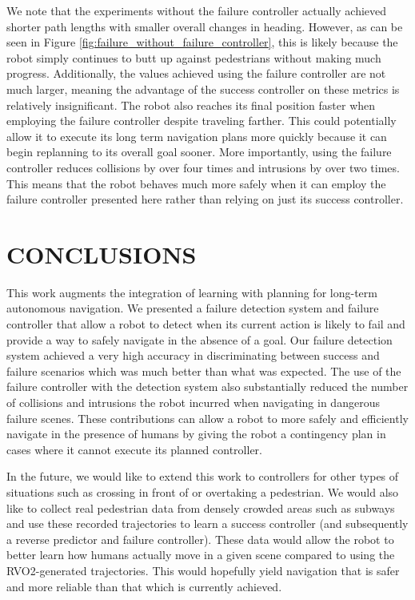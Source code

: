 \documentclass[letterpaper, 10 pt, conference]{ieeeconf}  %
\begin{document}
	We note that the experiments without the failure controller actually achieved shorter path lengths with smaller overall changes in heading. However, as can be seen in Figure \ref{fig:failure_without_failure_controller}, this is likely because the robot simply continues to butt up against pedestrians without making much progress. Additionally, the values achieved using the failure controller are not much larger, meaning the advantage of the success controller on these metrics is relatively insignificant. The robot also reaches its final position faster when employing the failure controller despite traveling farther. This could potentially allow it to execute its long term navigation plans more quickly because it can begin replanning to its overall goal sooner. More importantly, using the failure controller reduces collisions by over four times and intrusions by over two times. This means that the robot behaves much more safely when it can employ the failure controller presented here rather than relying on just its success controller. 

\section{CONCLUSIONS}\label{sec:conclusion}

	This work augments the integration of learning with planning for long-term autonomous navigation. We presented a failure detection system and failure controller that allow a robot to detect when its current action is likely to fail and provide a way to safely navigate in the absence of a goal. Our failure detection system achieved a very high accuracy in discriminating between success and failure scenarios which was much better than what was expected. The use of the failure controller with the detection system also substantially reduced the number of collisions and intrusions the robot incurred when navigating in dangerous failure scenes. These contributions can allow a robot to more safely and efficiently navigate in the presence of humans by giving the robot a contingency plan in cases where it cannot execute its planned controller.
	
	In the future, we would like to extend this work to controllers for other types of situations such as crossing in front of or overtaking a pedestrian. We would also like to collect real pedestrian data from densely crowded areas such as subways and use these recorded trajectories to learn a success controller (and subsequently a reverse predictor and failure controller). These data would allow the robot to better learn how humans actually move in a given scene compared to using the RVO2-generated trajectories. This would hopefully yield navigation that is safer and more reliable than that which is currently achieved.
\end{document}
